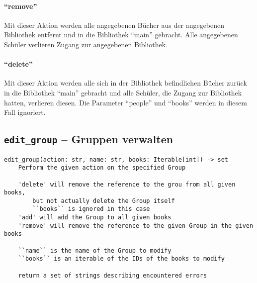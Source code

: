 
\paragraph{``remove''}
Mit dieser Aktion werden alle angegebenen Bücher aus der angegebenen Bibliothek entfernt und in die Bibliothek ``main'' gebracht. Alle angegebenen Schüler verlieren Zugang zur angegebenen Bibliothek.


\paragraph{``delete''}
Mit dieser Aktion werden alle sich in der Bibliothek befindlichen Bücher zurück in die Bibliothek ``main'' gebracht und alle Schüler, die Zugang zur Bibliothek hatten, verlieren diesen. Die Parameter ``people'' und ``books'' werden in diesem Fall ignoriert.


\subsection{\texttt{edit\_group} -- Gruppen verwalten}
\label{subsec:command_list:edit_group}

\begin{verbatim}
edit_group(action: str, name: str, books: Iterable[int]) -> set
    Perform the given action on the specified Group

    'delete' will remove the reference to the grou from all given books,
        but not actually delete the Group itself
        ``books`` is ignored in this case
    'add' will add the Group to all given books
    'remove' will remove the reference to the given Group in the given books

    ``name`` is the name of the Group to modify
    ``books`` is an iterable of the IDs of the books to modify

    return a set of strings describing encountered errors
\end{verbatim}

